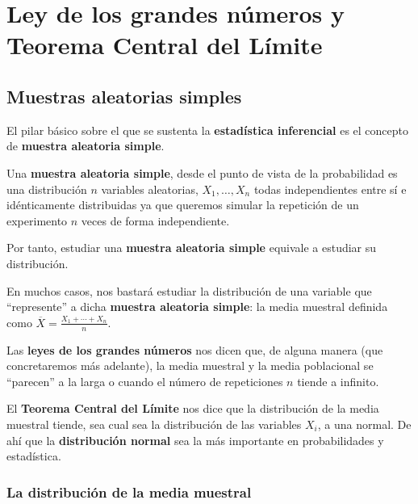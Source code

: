 \documentclass[
  letterpaper,
  DIV=11,
  numbers=noendperiod]{scrreprt}
\begin{document}

\hypertarget{ley-de-los-grandes-nuxfameros-y-teorema-central-del-luxedmite}{%
\chapter{Ley de los grandes números y Teorema Central del
Límite}\label{ley-de-los-grandes-nuxfameros-y-teorema-central-del-luxedmite}}

\hypertarget{muestras-aleatorias-simples}{%
\section{Muestras aleatorias
simples}\label{muestras-aleatorias-simples}}

El pilar básico sobre el que se sustenta la \textbf{estadística
inferencial} es el concepto de \textbf{muestra aleatoria simple}.

Una \textbf{muestra aleatoria simple}, desde el punto de vista de la
probabilidad es una distribución \(n\) variables aleatorias,
\(X_1,\ldots, X_n\) todas independientes entre sí e idénticamente
distribuidas ya que queremos simular la repetición de un experimento
\(n\) veces de forma independiente.

Por tanto, estudiar una \textbf{muestra aleatoria simple} equivale a
estudiar su distribución.

En muchos casos, nos bastará estudiar la distribución de una variable
que ``represente'' a dicha \textbf{muestra aleatoria simple}: la media
muestral definida como \(\overline{X}=\frac{X_1+\cdots + X_n}{n}\).

Las \textbf{leyes de los grandes números} nos dicen que, de alguna
manera (que concretaremos más adelante), la media muestral y la media
poblacional se ``parecen'' a la larga o cuando el número de repeticiones
\(n\) tiende a infinito.

El \textbf{Teorema Central del Límite} nos dice que la distribución de
la media muestral tiende, sea cual sea la distribución de las variables
\(X_i\), a una normal. De ahí que la \textbf{distribución normal} sea la
más importante en probabilidades y estadística.

\hypertarget{la-distribuciuxf3n-de-la-media-muestral}{%
\subsection{La distribución de la media
muestral}\label{la-distribuciuxf3n-de-la-media-muestral}}
\end{document}
